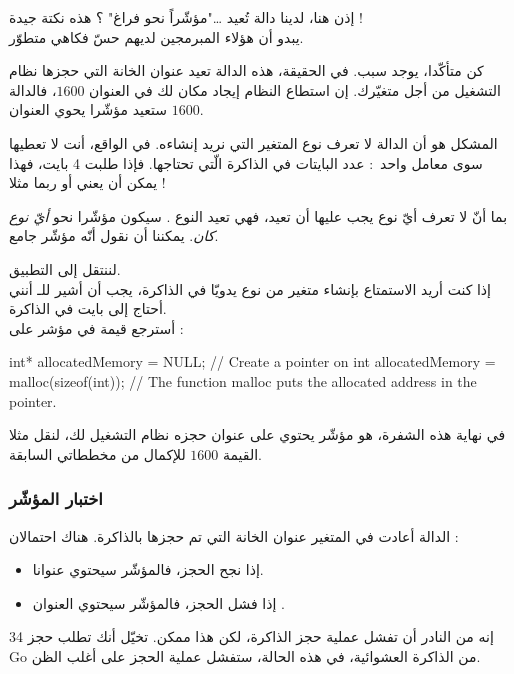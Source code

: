 إذن هنا، لدينا دالة تُعيد \dots "مؤشّراً نحو فراغ" ؟ هذه نكتة جيدة !\\
يبدو أن هؤلاء المبرمجين لديهم حسّ فكاهي متطوّر.

كن متأكّدا، يوجد سبب. في الحقيقة، هذه الدالة تعيد عنوان الخانة التي حجزها نظام التشغيل من أجل متغيّرك. إن استطاع النظام إيجاد مكان لك في العنوان
$1600$،
فالدالة ستعيد مؤشّرا يحوي العنوان
$1600$.

المشكل هو أن الدالة
لا تعرف نوع المتغير التي نريد إنشاءه. في الواقع، أنت لا تعطيها سوى معامل واحد~: عدد البايتات في الذاكرة الّتي تحتاجها. فإذا طلبت 4 بايت، فهذا يمكن أن يعني
أو ربما
مثلا !

بما أنّ
لا تعرف أيّ نوع يجب عليها أن تعيد، فهي تعيد النوع
.
سيكون مؤشّرا نحو
\textit{أيّ نوع كان}.
يمكننا أن نقول أنّه مؤشّر جامع.

لننتقل إلى التطبيق.\\
إذا كنت أريد الاستمتاع بإنشاء متغير من نوع
يدويّا في الذاكرة، يجب أن أشير للـ
أنني أحتاج إلى
بايت في الذاكرة.\\
أسترجع قيمة
في مؤشر على
 :

\begin{Csource}
int* allocatedMemory = NULL; // Create a pointer on int
allocatedMemory = malloc(sizeof(int)); // The function malloc puts the allocated address in the pointer.
\end{Csource}

في نهاية هذه الشفرة،
هو مؤشّر يحتوي على عنوان حجزه نظام التشغيل لك، لنقل مثلا القيمة
$1600$
للإكمال من مخططاتي السابقة.

\subsubsection{اختبار المؤشّر}
الدالة
أعادت في المتغير
عنوان الخانة التي تم حجزها بالذاكرة. هناك احتمالان :
\begin{itemize}
  \item إذا نجح الحجز، فالمؤشّر سيحتوي عنوانا.
  \item إذا فشل الحجز، فالمؤشّر سيحتوي العنوان
.
\end{itemize}

إنه من النادر أن تفشل عملية حجز الذاكرة، لكن هذا ممكن. تخيّل أنك تطلب حجز
\textenglish{34 Go}
من الذاكرة العشوائية، في هذه الحالة، ستفشل عملية الحجز على أغلب الظن.


